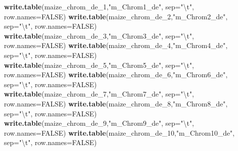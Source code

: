 \documentclass[]{article}
\newenvironment{Shaded}{\begin{snugshade}}{\end{snugshade}}
\newcommand{\CharTok}[1]{\textcolor[rgb]{0.31,0.60,0.02}{#1}}
\newcommand{\DataTypeTok}[1]{\textcolor[rgb]{0.13,0.29,0.53}{#1}}
\newcommand{\DecValTok}[1]{\textcolor[rgb]{0.00,0.00,0.81}{#1}}
\newcommand{\KeywordTok}[1]{\textcolor[rgb]{0.13,0.29,0.53}{\textbf{#1}}}
\newcommand{\NormalTok}[1]{#1}
\newcommand{\OtherTok}[1]{\textcolor[rgb]{0.56,0.35,0.01}{#1}}
\newcommand{\StringTok}[1]{\textcolor[rgb]{0.31,0.60,0.02}{#1}}
\begin{document}
\begin{Shaded}
\begin{Highlighting}[]
\KeywordTok{write.table}\NormalTok{(maize_chrom_de_}\DecValTok{1}\NormalTok{,}\StringTok{"m_Chrom1_de"}\NormalTok{, }\DataTypeTok{sep=}\StringTok{"}\CharTok{\textbackslash{}t}\StringTok{"}\NormalTok{, }\DataTypeTok{row.names=}\OtherTok{FALSE}\NormalTok{)}
\KeywordTok{write.table}\NormalTok{(maize_chrom_de_}\DecValTok{2}\NormalTok{,}\StringTok{"m_Chrom2_de"}\NormalTok{, }\DataTypeTok{sep=}\StringTok{"}\CharTok{\textbackslash{}t}\StringTok{"}\NormalTok{, }\DataTypeTok{row.names=}\OtherTok{FALSE}\NormalTok{)}
\KeywordTok{write.table}\NormalTok{(maize_chrom_de_}\DecValTok{3}\NormalTok{,}\StringTok{"m_Chrom3_de"}\NormalTok{, }\DataTypeTok{sep=}\StringTok{"}\CharTok{\textbackslash{}t}\StringTok{"}\NormalTok{, }\DataTypeTok{row.names=}\OtherTok{FALSE}\NormalTok{)}
\KeywordTok{write.table}\NormalTok{(maize_chrom_de_}\DecValTok{4}\NormalTok{,}\StringTok{"m_Chrom4_de"}\NormalTok{, }\DataTypeTok{sep=}\StringTok{"}\CharTok{\textbackslash{}t}\StringTok{"}\NormalTok{, }\DataTypeTok{row.names=}\OtherTok{FALSE}\NormalTok{)}
\KeywordTok{write.table}\NormalTok{(maize_chrom_de_}\DecValTok{5}\NormalTok{,}\StringTok{"m_Chrom5_de"}\NormalTok{, }\DataTypeTok{sep=}\StringTok{"}\CharTok{\textbackslash{}t}\StringTok{"}\NormalTok{, }\DataTypeTok{row.names=}\OtherTok{FALSE}\NormalTok{)}
\KeywordTok{write.table}\NormalTok{(maize_chrom_de_}\DecValTok{6}\NormalTok{,}\StringTok{"m_Chrom6_de"}\NormalTok{, }\DataTypeTok{sep=}\StringTok{"}\CharTok{\textbackslash{}t}\StringTok{"}\NormalTok{, }\DataTypeTok{row.names=}\OtherTok{FALSE}\NormalTok{)}
\KeywordTok{write.table}\NormalTok{(maize_chrom_de_}\DecValTok{7}\NormalTok{,}\StringTok{"m_Chrom7_de"}\NormalTok{, }\DataTypeTok{sep=}\StringTok{"}\CharTok{\textbackslash{}t}\StringTok{"}\NormalTok{, }\DataTypeTok{row.names=}\OtherTok{FALSE}\NormalTok{)}
\KeywordTok{write.table}\NormalTok{(maize_chrom_de_}\DecValTok{8}\NormalTok{,}\StringTok{"m_Chrom8_de"}\NormalTok{, }\DataTypeTok{sep=}\StringTok{"}\CharTok{\textbackslash{}t}\StringTok{"}\NormalTok{, }\DataTypeTok{row.names=}\OtherTok{FALSE}\NormalTok{)}
\KeywordTok{write.table}\NormalTok{(maize_chrom_de_}\DecValTok{9}\NormalTok{,}\StringTok{"m_Chrom9_de"}\NormalTok{, }\DataTypeTok{sep=}\StringTok{"}\CharTok{\textbackslash{}t}\StringTok{"}\NormalTok{, }\DataTypeTok{row.names=}\OtherTok{FALSE}\NormalTok{)}
\KeywordTok{write.table}\NormalTok{(maize_chrom_de_}\DecValTok{10}\NormalTok{,}\StringTok{"m_Chrom10_de"}\NormalTok{, }\DataTypeTok{sep=}\StringTok{"}\CharTok{\textbackslash{}t}\StringTok{"}\NormalTok{, }\DataTypeTok{row.names=}\OtherTok{FALSE}\NormalTok{)}
\end{Highlighting}
\end{Shaded}
\end{document}

